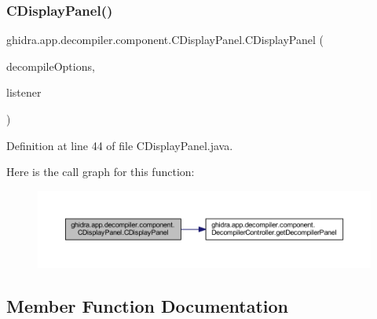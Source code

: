 \subsubsection{\texorpdfstring{CDisplayPanel()}{CDisplayPanel()}\hspace{0.1cm}{\footnotesize\ttfamily [2/2]}}
{\footnotesize\ttfamily ghidra.\+app.\+decompiler.\+component.\+C\+Display\+Panel.\+C\+Display\+Panel (\begin{DoxyParamCaption}\item[{\mbox{\hyperlink{classghidra_1_1app_1_1decompiler_1_1_decompile_options}{Decompile\+Options}}}]{decompile\+Options,  }\item[{\mbox{\hyperlink{interfaceghidra_1_1app_1_1decompiler_1_1component_1_1_decompile_results_listener}{Decompile\+Results\+Listener}}}]{listener }\end{DoxyParamCaption})\hspace{0.3cm}{\ttfamily [inline]}}



Definition at line 44 of file C\+Display\+Panel.\+java.

Here is the call graph for this function\+:
\nopagebreak
\begin{figure}[H]
\begin{center}
\leavevmode
\includegraphics[width=350pt]{classghidra_1_1app_1_1decompiler_1_1component_1_1_c_display_panel_a93da5ff4168353896ce34cf521dcaa8a_cgraph}
\end{center}
\end{figure}


\subsection{Member Function Documentation}
\mbox{\label{classghidra_1_1app_1_1decompiler_1_1component_1_1_c_display_panel_a8097a7e856b8595897a2709790ebd66f}} 

